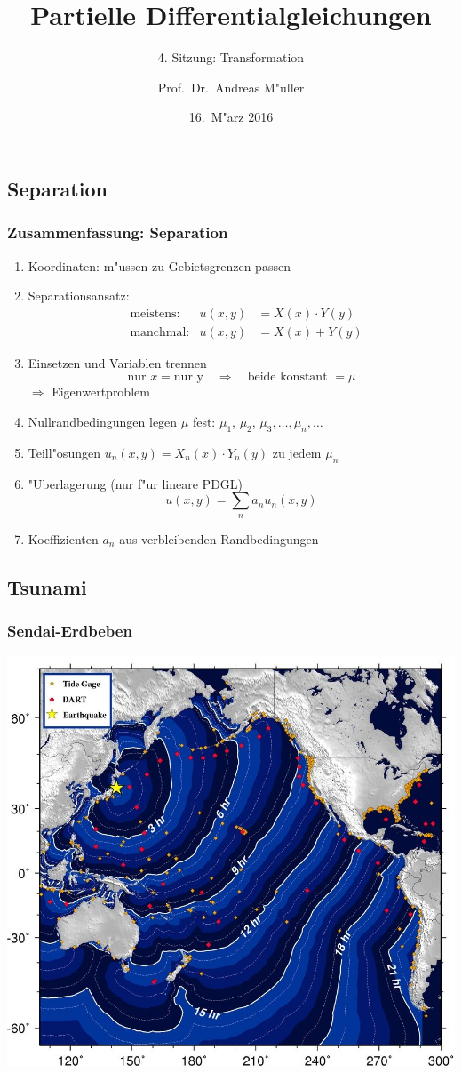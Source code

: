 \documentclass{beamer}
\title[]{Partielle Differentialgleichungen}
\subtitle{4. Sitzung: Transformation}
\date[16.~M"arz 2016]{16.~M"arz 2016}
\author{Prof.~Dr.~Andreas M"uller}
\begin{document}
\begin{frame}
\section{Separation}
\titlepage
\end{frame}

\begin{frame}
\frametitle{Zusammenfassung: Separation}
\begin{enumerate}
\item Koordinaten: m"ussen zu Gebietsgrenzen passen
\item Separationsansatz: 
\begin{align*}
&\text{meistens:}&u(x,y)&=X(x)\cdot Y(y)\\
&\text{manchmal:}&u(x,y)&=X(x)+Y(y)
\end{align*}
\item Einsetzen und Variablen trennen
\[
\text{nur $x$} = \text{nur y}\quad\Rightarrow\quad \text{beide konstant $=\mu$}
\]
$\Rightarrow$ Eigenwertproblem
\item Nullrandbedingungen legen $\mu$ fest: $\mu_1$, $\mu_2$,
$\mu_3,\dots,\mu_n,\dots$
\item Teill"osungen $u_n(x,y)=X_n(x)\cdot Y_n(y)$  zu jedem $\mu_n$
\item "Uberlagerung (nur f"ur lineare PDGL)
\[
u(x,y)=\sum_n a_nu_n(x,y)
\]
\item Koeffizienten $a_n$ aus verbleibenden Randbedingungen
\end{enumerate}
\end{frame}

\begin{frame}
\section{Tsunami}
\frametitle{Sendai-Erdbeben}
\begin{center}
\includegraphics[width=0.85\hsize]{../../skript/graphics/sendainoaa.jpg}
\end{center}
\end{frame}
\end{document}
